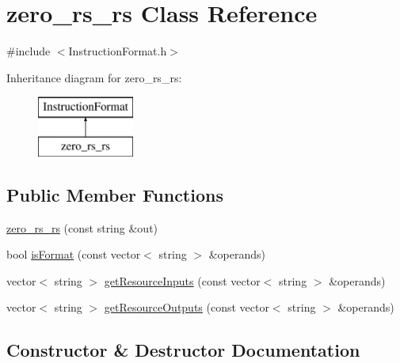 \hypertarget{classzero__rs__rs}{}\section{zero\+\_\+rs\+\_\+rs Class Reference}
\label{classzero__rs__rs}


{\ttfamily \#include $<$Instruction\+Format.\+h$>$}

Inheritance diagram for zero\+\_\+rs\+\_\+rs\+:\begin{figure}[H]
\begin{center}
\leavevmode
\includegraphics[height=2.000000cm]{classzero__rs__rs}
\end{center}
\end{figure}
\subsection*{Public Member Functions}
\begin{DoxyCompactItemize}
\item 
\hyperlink{classzero__rs__rs_aea7bb56f80a5f415c1cc161fb88960f4}{zero\+\_\+rs\+\_\+rs} (const string \&out)
\item 
bool \hyperlink{classzero__rs__rs_a0a3cc74b189c29a3665a4ab80e3b0aba}{is\+Format} (const vector$<$ string $>$ \&operands)
\item 
vector$<$ string $>$ \hyperlink{classzero__rs__rs_a697c00ba542cb6f8f610dce7501ecab5}{get\+Resource\+Inputs} (const vector$<$ string $>$ \&operands)
\item 
vector$<$ string $>$ \hyperlink{classzero__rs__rs_a8700492ca6deb31a550493e267468c4c}{get\+Resource\+Outputs} (const vector$<$ string $>$ \&operands)
\end{DoxyCompactItemize}


\subsection{Constructor \& Destructor Documentation}
\mbox{\label{classzero__rs__rs_aea7bb56f80a5f415c1cc161fb88960f4}} 
